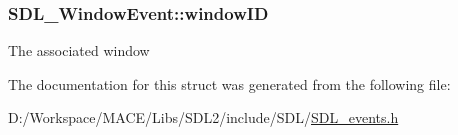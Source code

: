 \subsubsection[{\texorpdfstring{window\+ID}{windowID}}]{ S\+D\+L\+\_\+\+Window\+Event\+::window\+ID}\hypertarget{struct_s_d_l___window_event_a4b31796ffc84fbb7f6e9ba33e127619a}{}\label{struct_s_d_l___window_event_a4b31796ffc84fbb7f6e9ba33e127619a}
The associated window 

The documentation for this struct was generated from the following file\+:\begin{DoxyCompactItemize}
\item 
D\+:/\+Workspace/\+M\+A\+C\+E/\+Libs/\+S\+D\+L2/include/\+S\+D\+L/\hyperlink{_s_d_l__events_8h}{S\+D\+L\+\_\+events.\+h}\end{DoxyCompactItemize}
